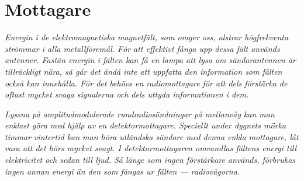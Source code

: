 \section{Mottagare}
\label{mottagare}

\emph{Energin i de elektromagnetiska magnetfält, som omger oss,
  alstrar högfrekventa strömmar i alla metallföremål. För att
  effektivt fånga upp dessa fält används antenner.  Fastän energin i
  fälten kan få en lampa att lysa om sändarantennen är tillräckligt
  nära, så går det ändå inte att uppfatta den information som fälten
  också kan innehålla.  För det behövs en radiomottagare för att dels
  förstärka de oftast mycket svaga signalerna och dels uttyda
  informationen i dem.}

\emph{Lyssna på amplitudmodulerade rundradiosändningar på mellanvåg
  kan man enklast göra med hjälp av en detektormottagare. Speciellt
  under dygnets mörka timmar vintertid kan man höra utländska sändare
  med denna enkla mottagare, låt vara att det hörs mycket svagt. I
  detektormottagaren omvandlas fältens energi till elektricitet och
  sedan till ljud. Så länge som ingen förstärkare används, förbrukas
  ingen annan energi än den som fångas ur fälten --- radiovågorna.}
